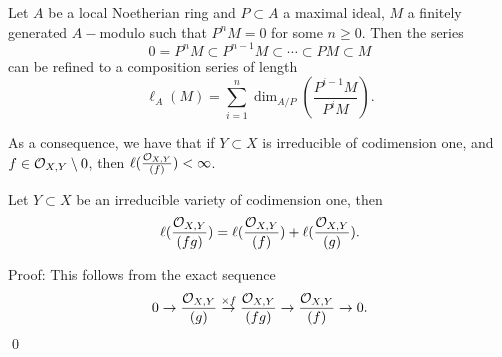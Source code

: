\begin{dang}
    \begin{proposition}
        Let $A$ be a local Noetherian ring and $P\subset A$ a maximal ideal, $M$ a
        finitely generated $A-$modulo such that $P^nM=0$ for some $n\geq0$. Then the series 
        \begin{equation}
            0 = P^nM \subset P^{n-1}M\subset\cdots\subset PM \subset M 
        \end{equation} 
        can be refined to a composition series of length 
        \begin{equation}\label{equation: length of a module}
            \ell_A(M) = \sum_{i=1}^n \dim_{A/P}(\frac{P^{i-1}M}{P^iM}).
        \end{equation}
    \end{proposition}
\end{dang}
As a consequence, we have that if $Y\subset X$ is irreducible of codimension one, and 
$f\in\mathcal{O}_{X,Y}\setminus0$, then $\ell(\tfrac{\mathcal{O}_{X,Y}}{(f)})<\infty$. 
\begin{dang}
    \begin{proposition}
        Let $Y\subset X$ be an irreducible variety of codimension one, then 
        \begin{equation}
            \ell(\frac{\mathcal{O}_{X,Y}}{(fg)}) = \ell(\frac{\mathcal{O}_{X,Y}}{(f)})
            +\ell(\frac{\mathcal{O}_{X,Y}}{(g)}).
        \end{equation}
    \end{proposition}
\end{dang}
Proof: This follows from the exact sequence 
\begin{equation}
    0 \to \frac{\mathcal{O}_{X,Y}}{(g)}\overset{\times f}{\to}\frac{\mathcal{O}_{X,Y}}{(fg)}\to \frac{\mathcal{O}_{X,Y}}{(f)}\to  0.
\end{equation}
\qed

